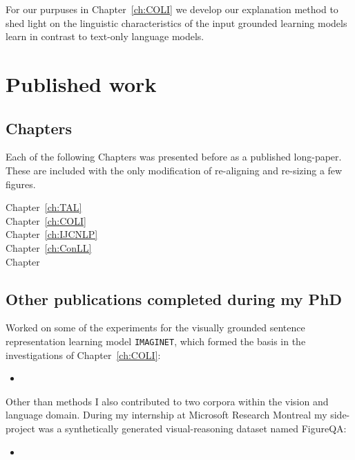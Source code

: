 For our purpuses in Chapter~\ref{ch:COLI} we develop our explanation method to
shed light on the linguistic characteristics of the input grounded learning
models learn in contrast to text-only language models.

\section{Published work}

\subsection{Chapters}

Each of the following Chapters was presented before as a published long-paper. These are included with
the only modification of re-aligning and re-sizing a few figures.

\begin{description}
	\item[Chapter~\ref{ch:TAL}] 
	\item[Chapter~\ref{ch:COLI}] 
	\item[Chapter~\ref{ch:IJCNLP}] 
	\item[Chapter~\ref{ch:ConLL}] 
	\item[Chapter ]
\end{description}

\subsection{Other publications completed during my PhD}

Worked on some of the experiments for the visually grounded sentence representation learning
model \texttt{IMAGINET}, which formed the basis in the investigations of Chapter~\ref{ch:COLI}:

\begin{itemize}
\item {}
\end{itemize}

Other than methods I also contributed to two corpora within the vision and language domain.
During my internship at Microsoft Research Montreal my side-project was a synthetically generated visual-reasoning
dataset named FigureQA:

\begin{itemize}
\item {}
\end{itemize}

